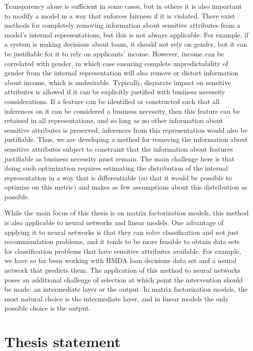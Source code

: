Transparency alone is sufficient in some cases, but in others it is also
important to modify a model in a way that enforces fairness if it is violated.
There exist methods for completely removing information about sensitive
attributes from a model's internal representations\cite{Beutel2017DataDA}, but
this is not always applicable. For example, if a system is making decisions
about loans, it should not rely on gender, but it can be justifiable for it to
rely on applicants' income. However, income can be correlated with gender, in
which case ensuring complete unpredictability of gender from the internal
representation will also remove or distort information about income, which is
undesirable. Typically, disparate impact on sensitive attributes is allowed if it
can be explicitly justified with business necessity considerations. If a feature
can be identified or constructed such that all inferences on it can be considered
a business necessity, then this feature can be retained in all representations,
and so long as no other information about sensitive attributes is preserved, 
inferences from this representation would also be justifiable.
Thus, we are developing a method for removing the information
about sensitive attributes subject to constraint that the information about
features justifiable as business necessity must remain. The main challenge here
is that doing such optimization requires estimating the distribution of the
internal representation in a way that is differentiable (so that it would be
possible to optimize on this metric) and makes as few assumptions about this
distribution as possible.

While the main focus of this thesis is on matrix factorization models, this
method is also applicable to neural networks and linear models. One advantage of
applying it to neural networks is that they can solve classification and not
just recommendation problems, and it tends to be more feasible to obtain data
sets for classification problems that have sensitive attributes available. For
example, we have so far been working with HMDA loan decisions data set and a
neural network that predicts them. The application of this method to neural
networks poses an additional challenge of selection at which point the
intervention should be made: an intermediate layer or the output. In matrix
factorization models, the most natural choice is the intermediate layer, and in
linear models the only possible choice is the output.

\section{Thesis statement}

